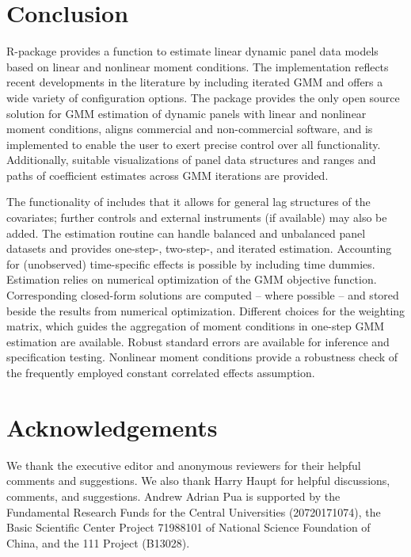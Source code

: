 \section{Conclusion} \label{sec:conclusion}

R-package  provides a function to estimate linear dynamic panel data models based on linear and nonlinear moment conditions. The implementation reflects recent developments in the literature by including iterated GMM and offers a wide variety of configuration options.
The package provides the only open source solution for GMM estimation of dynamic panels with linear and nonlinear moment conditions, aligns commercial and non-commercial software, and is implemented to enable the user to exert precise control over all functionality. Additionally, suitable visualizations of panel data structures and ranges and paths of coefficient estimates across GMM iterations are provided.

The functionality of  includes that it allows for general lag structures of the covariates; further controls and external instruments (if available) may also be added. The estimation routine can handle balanced and unbalanced panel datasets and provides one-step-, two-step-, and iterated estimation. Accounting for (unobserved) time-specific effects is possible by including time dummies.
Estimation relies on numerical optimization of the GMM objective function. Corresponding closed-form solutions are computed -- where possible -- and stored beside the results from numerical optimization.
Different choices for the weighting matrix, which guides the aggregation of moment conditions in one-step GMM estimation are available.
Robust standard errors are available for inference and specification testing. Nonlinear moment conditions provide a robustness check of the frequently employed constant correlated effects assumption.






\section{Acknowledgements}
We thank the executive editor and anonymous reviewers for their helpful comments and suggestions.
We also thank Harry Haupt for helpful discussions, comments, and suggestions.
Andrew Adrian Pua is supported by the Fundamental Research Funds for the Central Universities (20720171074), the Basic Scientific Center Project 71988101 of National Science Foundation of China, and the 111 Project (B13028).






